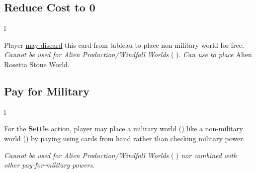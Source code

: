 \documentclass[letterpaper,landscape,twocolumn,8pt]{extarticle}
\newcommand{\inline}[1]{\scalerel*{#1}{M}}
\begin{document}
\begin{minipage}[t]{\calc{1/3}\columnwidth}
\setlength{\intextsep}{0pt}%

\subsection*{Reduce Cost to 0}
\begin{wrapfigure}{l}{\columnwidth}
    
\end{wrapfigure}

Player \underline{may discard} this card from tableau to place non-military
world for free.
\smallbreak{}
\textit{Cannot be used for Alien Production/Windfall Worlds}
(\inline{}
\inline{}). \textit{Can use to place} Alien Rosetta Stone World.
\subsection*{Pay for Military}
\begin{wrapfigure}{l}{\columnwidth}
    
\end{wrapfigure}

For the \textbf{Settle} action, player may place a military world
(\inline{}) like a non-military
world (\inline{}) by paying
using cards from hand rather than checking military power.

\smallbreak{}

\textit{Cannot be used for Alien Production/Windfall Worlds}
(\inline{}
\inline{}) \textit{nor
combined with other pay-for-military powers}.

\end{minipage}
\end{document}
